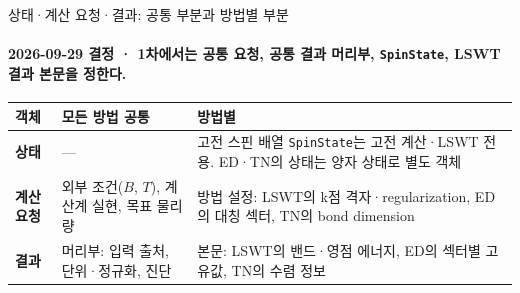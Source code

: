 \begin{frame}[label=object-scope]{상태·계산 요청·결과: 공통 부분과 방법별 부분}
  \framesubtitle{2026-09-29 결정 · 1차에서는 공통 요청, 공통 결과 머리부, \texttt{SpinState}, LSWT 결과 본문을 정한다.}
  \begin{tabularx}{\textwidth}{@{}p{2.0cm}P{5.0cm}Y@{}}
    \toprule
    객체 & 모든 방법 공통 & 방법별 \\
    \midrule
    \textbf{상태} & — & 고전 스핀 배열 \texttt{SpinState}는 고전 계산·LSWT 전용. ED·TN의 상태는 양자 상태로 별도 객체 \\
    \textbf{계산 요청} & 외부 조건($B$, $T$), 계산계 실현, 목표 물리량 & 방법 설정: LSWT의 k점 격자·regularization, ED의 대칭 섹터, TN의 bond dimension \\
    \textbf{결과} & 머리부: 입력 출처, 단위·정규화, 진단 & 본문: LSWT의 밴드·영점 에너지, ED의 섹터별 고유값, TN의 수렴 정보 \\
    \bottomrule
  \end{tabularx}
  \par\medskip
\end{frame}

